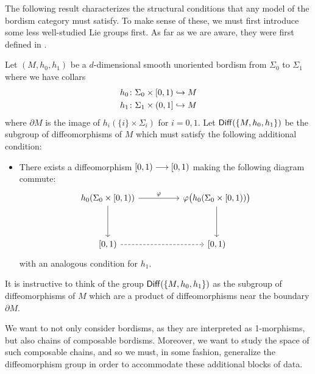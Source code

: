 The following result characterizes the structural conditions that any model of the bordism category must satisfy. To make sense of these, we must first introduce some less well-studied Lie groups first. As far as we are aware, they were first defined in \cite{GMTW09}. 

\begin{definition}\label{ch3:: def: iso bordism}
 Let $(M,h_0,h_1)$ be a $d$-dimensional smooth unoriented bordism from $\Sigma_0$ to $\Sigma_1$ where we have collars
 \begin{align}
    h_0 \colon \Sigma_0 \times [0,1) &\hookrightarrow M \\
    h_1 \colon \Sigma_1 \times (0,1] &\hookrightarrow M
 \end{align}
 where $\partial M$ is the image of $h_{i}(\{i\}\times \Sigma_i)$ for $i=0,1$. Let $\operatorname{{\sf Diff}}(\{M,h_0,h_1\})$ be the subgroup of diffeomorphisms of $M$ which must satisfy the following additional condition: 
 \begin{itemize}
    \item[($*$)] There exists a diffeomorphism $[0,1) \longrightarrow [0,1)$ making the following diagram commute:
    \begin{equation}
        \begin{tikzcd}
            {h_0(\Sigma_0\times [0,1))} && {\varphi\big(h_0(\Sigma_0\times [0,1))\big)} \\
            \\
            {[0,1)} && {[0,1)}
            \arrow["\varphi", from=1-1, to=1-3]
            \arrow[from=1-1, to=3-1]
            \arrow[from=1-3, to=3-3]
            \arrow[dashed, from=3-1, to=3-3]
        \end{tikzcd}
    \end{equation} 
    with an analogous condition for $h_1$.
 \end{itemize}
\end{definition}

\begin{observation}
    It is instructive to think of the group $\operatorname{{\sf Diff}}(\{M,h_0,h_1\})$ as the subgroup of diffeomorphisms of $M$ which are a product of diffeomorphisms near the boundary $\partial M$.
\end{observation}

We want to not only consider bordisms, as they are interpreted as 1-morphisms, but also chains of composable bordisms. Moreover, we want to study the space of such composable chains, and so we must, in some fashion, generalize the diffeomorphism group in order to accommodate these additional blocks of data.

